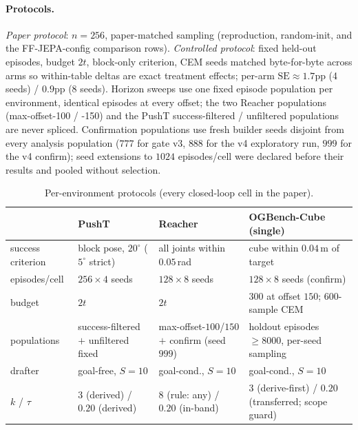 \documentclass{article}
\newcommand{\degc}[1]{$#1^\circ$}
\begin{document}
\paragraph{Protocols.} \emph{Paper protocol}: $n{=}256$, paper-matched sampling
(reproduction, random-init, and the FF-JEPA-config comparison rows). \emph{Controlled
protocol}: fixed held-out episodes, budget $2t$, block-only criterion, CEM seeds
matched byte-for-byte across arms so within-table deltas are exact treatment effects;
per-arm $\mathrm{SE}\approx1.7$pp (4 seeds) / $0.9$pp (8 seeds). Horizon sweeps use one
fixed episode population per environment, identical episodes at every offset; the two
Reacher populations (max-offset-100 / -150) and the PushT success-filtered /
unfiltered populations are never spliced. Confirmation populations use fresh builder
seeds disjoint from every analysis population ($777$ for gate v3, $888$ for the v4
exploratory run, $999$ for the v4 confirm); seed extensions to $1024$
episodes/cell were declared before their results and pooled without selection.

\begin{table}[h]
\centering
\small
\setlength{\tabcolsep}{4pt}
\caption{Per-environment protocols (every closed-loop cell in the paper).}
\label{tab:protocols}
\begin{tabular}{lp{3.2cm}p{3.4cm}p{5.4cm}}
\toprule
& PushT & Reacher & OGBench-Cube (single) \\
\midrule
success criterion & block pose, \degc{20} (\degc{5} strict) & all joints within $0.05$\,rad & cube within $0.04$\,m of target \\
episodes/cell & $256\times4$ seeds & $128\times8$ seeds & $128\times8$ seeds (confirm) \\
budget & $2t$ & $2t$ & $300$ at offset $150$; $600$-sample CEM \\
populations & success-filtered $+$ unfiltered fixed & max-offset-$100$/$150$ $+$ confirm (seed $999$) & holdout episodes ${\ge}8000$, per-seed sampling \\
drafter & goal-free, $S{=}10$ & goal-cond., $S{=}10$ & goal-cond., $S{=}10$ \\
$k$ / $\tau$ & $3$ (derived) / $0.20$ (derived) & $8$ (rule: any) / $0.20$ (in-band) & $3$ (derive-first) / $0.20$ (transferred; scope guard) \\
\bottomrule
\end{tabular}
\end{table}
\end{document}
